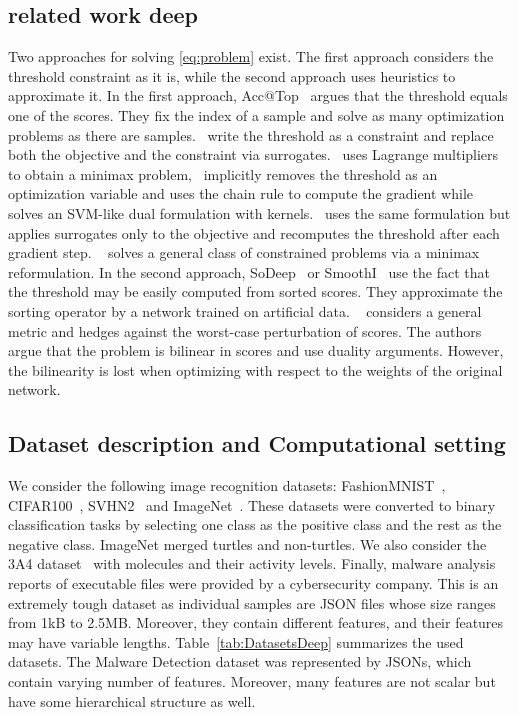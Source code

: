 \subsection{related work deep}

Two approaches for solving \eqref{eq:problem} exist. The first approach considers the threshold constraint as it is, while the second approach uses heuristics to approximate it. In the first approach, Acc@Top~\cite{boyd2012accuracy} argues that the threshold equals one of the scores. They fix the index of a sample and solve as many optimization problems as there are samples.~\cite{eban2017scalable,adam2021general,kumar2021implicit} write the threshold as a constraint and replace both the objective and the constraint via surrogates.~\cite{eban2017scalable} uses Lagrange multipliers to obtain a minimax problem,~\cite{mackey2018constrained} implicitly removes the threshold as an optimization variable and uses the chain rule to compute the gradient while~\cite{macha2020nonlinear} solves an SVM-like dual formulation with kernels.~\cite{grill2016learning} uses the same formulation but applies surrogates only to the objective and recomputes the threshold after each gradient step. \TFCO~\cite{cotter2019optimization} solves a general class of constrained problems via a minimax reformulation. In the second approach, SoDeep~\cite{engilberge2019sodeep} or SmoothI~\cite{thonet2021smoothi} use the fact that the threshold may be easily computed from sorted scores. They approximate the sorting operator by a network trained on artificial data. \APPerf~\cite{fathony2019ap} considers a general metric and hedges against the worst-case perturbation of scores. The authors argue that the problem is bilinear in scores and use duality arguments. However, the bilinearity is lost when optimizing with respect to the weights of the original network. 

\subsection{Dataset description and Computational setting}\label{sec:set}

We consider the following image recognition datasets: FashionMNIST~\cite{xiao2017fashionmnist}, CIFAR100~\cite{krizhevsky2009learning}, SVHN2~\cite{netzer2011reading} and ImageNet~\cite{russakovsky2015imagenet}. These datasets were converted to binary classification tasks by selecting one class as the positive class and the rest as the negative class. ImageNet merged turtles and non-turtles. We also consider the 3A4 dataset~\cite{ma2015deep} with molecules and their activity levels. Finally, malware analysis reports of executable files were provided by a cybersecurity company. This is an extremely tough dataset as individual samples are JSON files whose size ranges from 1kB to 2.5MB. Moreover, they contain different features, and their features may have variable lengths. Table~\ref{tab:DatasetsDeep} summarizes the used datasets. The Malware Detection dataset was represented by JSONs, which contain varying number of features. Moreover, many features are not scalar but have some hierarchical structure as well.

